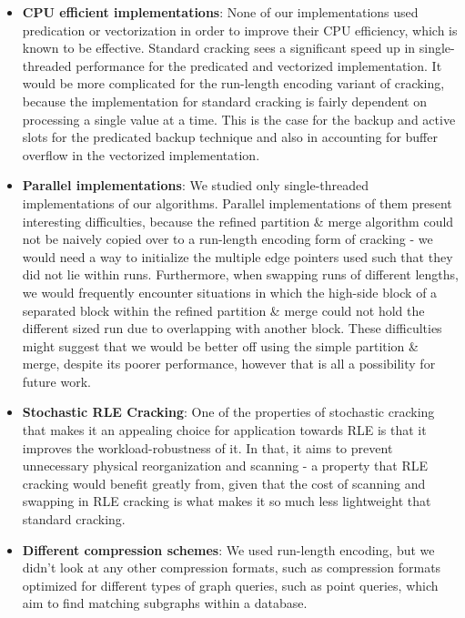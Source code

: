 \begin{itemize}
\item \textbf{CPU efficient implementations}: None of our implementations used predication or vectorization in order to improve their CPU efficiency, which is known to be effective\cite{Pirk:2014:DCF:2619228.2619232}. Standard cracking sees a significant speed up in single-threaded performance for the predicated and vectorized implementation. It would be more complicated for the run-length encoding variant of cracking, because the implementation for standard cracking is fairly dependent on processing a single value at a time. This is the case for the backup and active slots for the predicated backup technique and also in accounting for buffer overflow in the vectorized implementation.
\item \textbf{Parallel implementations}: We studied only single-threaded implementations of our algorithms. Parallel implementations of them present interesting difficulties, because the refined partition \& merge algorithm\cite{Pirk:2014:DCF:2619228.2619232} could not be naively copied over to a run-length encoding form of cracking - we would need a way to initialize the multiple edge pointers used such that they did not lie within runs. Furthermore, when swapping runs of different lengths, we would frequently encounter situations in which the high-side block of a separated block within the refined partition \& merge could not hold the different sized run due to overlapping with another block. These difficulties might suggest that we would be better off using the simple partition \& merge, despite its poorer performance, however that is all a possibility for future work.
\item \textbf{Stochastic RLE Cracking}\cite{Halim:2012:SDC:2168651.2168652}: One of the properties of stochastic cracking that makes it an appealing choice for application towards RLE is that it improves the workload-robustness of it. In that, it aims to prevent unnecessary physical reorganization and scanning - a property that RLE cracking would benefit greatly from, given that the cost of scanning and swapping in RLE cracking is what makes it so much less lightweight that standard cracking.
\item \textbf{Different compression schemes}: We used run-length encoding, but we didn't look at any other compression formats, such as compression formats optimized for different types of graph queries, such as point queries, which aim to find matching subgraphs within a database.
\end{itemize}